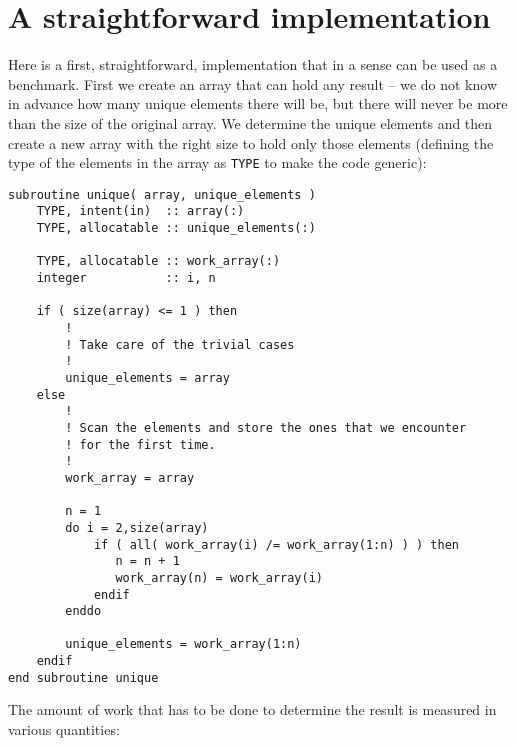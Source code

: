 \documentclass[onecolumn]{article}
\begin{document}
\section*{A straightforward implementation}
Here is a first, straightforward, implementation that in a sense can be used as a benchmark. First we create an
array that can hold any result -- we do not know in advance how many unique elements there will be, but there will never
be more than the size of the original array. We determine the unique elements and then create a new array with the right size to hold
only those elements (defining the type of the elements in the array as \verb+TYPE+ to make the code generic):
%
\begin{verbatim}
subroutine unique( array, unique_elements )
    TYPE, intent(in)  :: array(:)
    TYPE, allocatable :: unique_elements(:)

    TYPE, allocatable :: work_array(:)
    integer           :: i, n

    if ( size(array) <= 1 ) then
        !
        ! Take care of the trivial cases
        !
        unique_elements = array
    else
        !
        ! Scan the elements and store the ones that we encounter
        ! for the first time.
        !
        work_array = array

        n = 1
        do i = 2,size(array)
            if ( all( work_array(i) /= work_array(1:n) ) ) then
               n = n + 1
               work_array(n) = work_array(i)
            endif
        enddo

        unique_elements = work_array(1:n)
    endif
end subroutine unique
\end{verbatim}
%
The amount of work that has to be done to determine the result is measured in various quantities:
\end{document}
